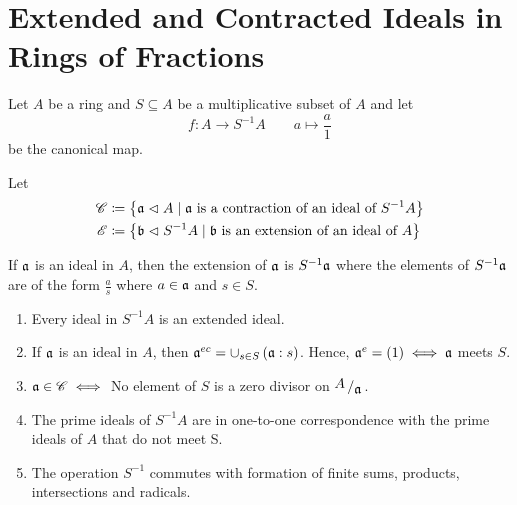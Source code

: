 \section{Extended and Contracted Ideals in Rings of Fractions}

Let \(A\) be a ring and \(S \subseteq A\) be a multiplicative
subset of \(A\) and let
\[
	\boxed{f \colon A \to S^{-1}A \qquad a \mapsto \frac{a}{1}}
\]
be the canonical map.

Let
\begin{align*}
	{\mathscr{C}} &\coloneqq \left\{ \mathfrak{a} \vartriangleleft A \mid \mathfrak{a} \text{ is a contraction
		of an ideal of } S^{-1}A \right\} \\
	{\mathscr{E}} &\coloneqq \left\{ \mathfrak{b} \vartriangleleft S^{-1}A \mid \mathfrak{b} \text{ is an
		extension of an ideal of } A \right\}
\end{align*}

If \(\mathfrak{a}\) is an ideal in \(A\), then the extension of \(\mathfrak{a}\) is
\(S^{-1} \mathfrak{a}\) where the elements of \(S^{-1} \mathfrak{a}\) are of the form
\(\frac{a}{s}\) where \(a \in \mathfrak{a}\) and \(s \in S\).

\begin{proposition}{}{}
\label{prop:3_11}
	\begin{enumerate}
		\item Every ideal in \(S^{-1}A\) is an extended ideal.
		\item If \(\mathfrak{a}\) is an ideal in \(A\), then
			\(\mathfrak{a}^{ec} = \cup_{s \in S} \left( \mathfrak{a} : s \right)\).
			Hence, \(\mathfrak{a}^e = (1) \iff \mathfrak{a}\) meets \(S\).
		\item \(\mathfrak{a} \in {\mathscr{C}} \iff \) No element of \(S\) is a zero divisor
			on \(\bigslant{A}{\mfa}\).
		\item The prime ideals of \(S^{-1}A\) are in one-to-one
			correspondence with the prime ideals of \(A\) that do not
			meet S\@.
		\item The operation \(S^{-1}\) commutes with formation of
			finite sums, products, intersections and radicals.
	\end{enumerate}
\end{proposition}

